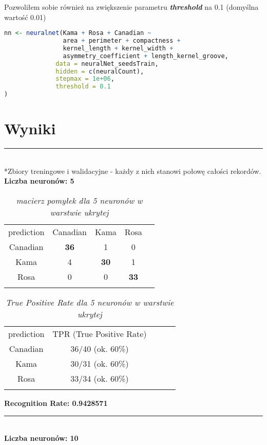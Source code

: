 \documentclass[a4paper,12pt]{article}
\newcommand{\linia}{\rule{\linewidth}{0.5pt}}
\theoremstyle{mytheor}
\begin{document}
Pozwoliłem sobie również na zwiększenie parametru \textbf{\emph{threshold}} na 0.1 (domyślna wartość 0.01)

\begin{lstlisting}[language=R]
nn <- neuralnet(Kama + Rosa + Canadian ~
                area + perimeter + compactness + 
                kernel_length + kernel_width + 
                asymmetry_coefficient + length_kernel_groove,
              data = neuralNet_seedsTrain,
              hidden = c(neuralCount),
              stepmax = 1e+06,
              threshold = 0.1
)
\end{lstlisting}

\section*{Wyniki}
\linia\\
*Zbiory treningowe i walidacyjne - każdy z nich stanowi połowę całości rekordów.\\

\textbf{Liczba neuronów: 5}\\

\begin{table}[H]
\begin{tabular}{ccccc}
prediction & Canadian & Kama & Rosa  &  \\
Canadian & \textbf{36} & 1 & 0 &  \\
Kama & 4 & \textbf{30} & 1 &  \\
Rosa & 0 & 0 & \textbf{33} &  \\
&&&& 
\end{tabular}
\caption{\textit{macierz pomyłek dla 5 neuronów w warstwie ukrytej}}
\label{tab:1}
\end{table}
\begin{table}[H]
\begin{tabular}{ccccc}
prediction & TPR (True Positive Rate) &  \\
Canadian & 36/40 (ok. 60\%) & \\
Kama & 30/31 (ok. 60\%) & \\
Rosa & 33/34 (ok. 60\%) & \\
&&
\end{tabular}
\caption{\textit{True Positive Rate dla 5 neuronów w warstwie ukrytej}}
\label{tab:2}
\end{table}
\textbf{Recognition Rate: 0.9428571}\\
\linia\\

\textbf{Liczba neuronów: 10}\\
\end{document}

